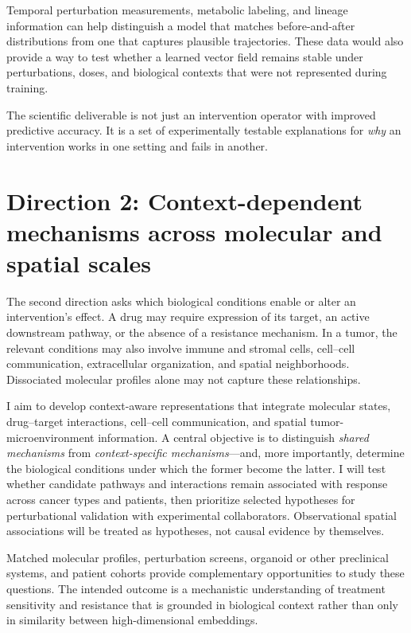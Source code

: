 \documentclass[11pt]{article}
\begin{document}
Temporal perturbation measurements, metabolic labeling, and lineage information can help distinguish a model that matches before-and-after distributions from one that captures plausible trajectories. These data would also provide a way to test whether a learned vector field remains stable under perturbations, doses, and biological contexts that were not represented during training.

The scientific deliverable is not just an intervention operator with improved predictive accuracy. It is a set of experimentally testable explanations for \emph{why} an intervention works in one setting and fails in another.

\section*{Direction 2: Context-dependent mechanisms across molecular and spatial scales}

The second direction asks which biological conditions enable or alter an intervention's effect. A drug may require expression of its target, an active downstream pathway, or the absence of a resistance mechanism. In a tumor, the relevant conditions may also involve immune and stromal cells, cell--cell communication, extracellular organization, and spatial neighborhoods. Dissociated molecular profiles alone may not capture these relationships.

I aim to develop context-aware representations that integrate molecular states, drug--target interactions, cell--cell communication, and spatial tumor-microenvironment information. A central objective is to distinguish \emph{shared mechanisms} from \emph{context-specific mechanisms}---and, more importantly, determine the biological conditions under which the former become the latter. I will test whether candidate pathways and interactions remain associated with response across cancer types and patients, then prioritize selected hypotheses for perturbational validation with experimental collaborators. Observational spatial associations will be treated as hypotheses, not causal evidence by themselves.

Matched molecular profiles, perturbation screens, organoid or other preclinical systems, and patient cohorts provide complementary opportunities to study these questions. The intended outcome is a mechanistic understanding of treatment sensitivity and resistance that is grounded in biological context rather than only in similarity between high-dimensional embeddings.
\end{document}
